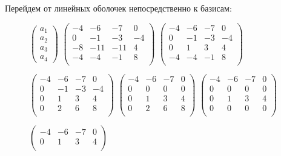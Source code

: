 \documentclass[10pt]{article}
\begin{document}
 \\ \\
Перейдем от линейных оболочек непосредственно к базисам:
\begin{figure}[H] 
 $\begin{pmatrix}
 a_1 \\
 a_2 \\
 a_3 \\
 a_4
 \end{pmatrix}$
 \text{ = }
 $\begin{pmatrix}
-4 & -6 & -7 & 0 \\
0 & -1 & -3 & -4 \\
-8 & -11 & -11 & 4 \\
-4 & -4 & -1 & 8 \\
 \end{pmatrix}$
 \text{ = }
 $\begin{pmatrix}
 -4 & -6 & -7 & 0 \\
 0 & -1 & -3 & -4 \\
 0 & 1 & 3 & 4 \\
 -4 & -4 & -1 & 8 \\
 \end{pmatrix}$
 \text{ = }
 
 \text{ = }
 $\begin{pmatrix}
 -4 & -6 & -7 & 0 \\
 0 & -1 & -3 & -4 \\
 0 & 1 & 3 & 4 \\
 0 & 2 & 6 & 8 \\
 \end{pmatrix}$
 \text{ = }
 $\begin{pmatrix}
-4 & -6 & -7 & 0 \\
0 & 0 & 0 & 0 \\
0 & 1 & 3 & 4 \\
0 & 2 & 6 & 8 \\
 \end{pmatrix}$
 \text{ = }
 $\begin{pmatrix}
-4 & -6 & -7 & 0 \\
0 & 0 & 0 & 0 \\
0 & 1 & 3 & 4 \\
0 & 0 & 0 & 0 \\
 \end{pmatrix}$
 \text{ = }
 
 \text{ = }
 $\begin{pmatrix}
 -4 & -6 & -7 & 0 \\
 0 & 1 & 3 & 4 \\ 
 \end{pmatrix}$
\end{figure}
\end{document}
